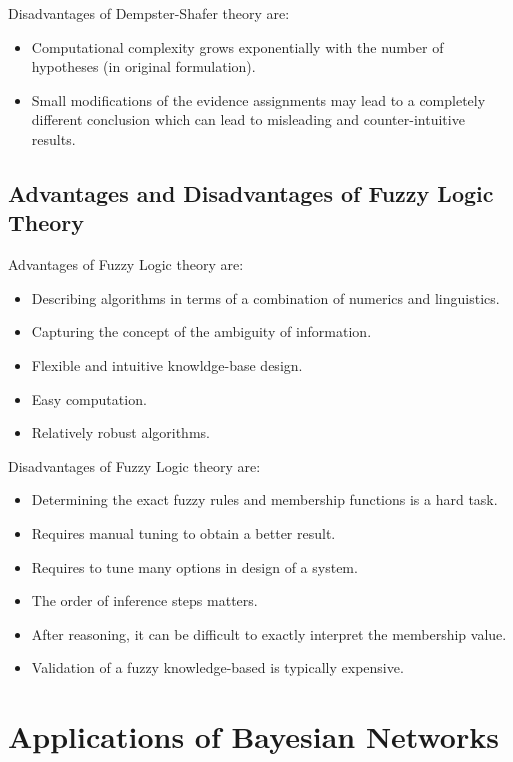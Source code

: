 \documentclass[11pt]{article}
\begin{document}
\noindent Disadvantages of Dempster-Shafer theory are:

\begin{itemize}
  \item Computational complexity grows exponentially with the number of
  hypotheses (in original formulation).
  
  \item Small modifications of the evidence assignments may lead to a
  completely different conclusion which can lead to misleading and
  counter-intuitive results.
\end{itemize}

\subsection{Advantages and Disadvantages of Fuzzy Logic Theory}

Advantages of Fuzzy Logic theory are:

\begin{itemize}
  \item Describing algorithms in terms of a combination of numerics and
  linguistics.
  \item Capturing the concept of the ambiguity of information.
  \item Flexible and intuitive knowldge-base design.
  \item Easy computation.
  \item Relatively robust algorithms.
\end{itemize}

\noindent Disadvantages of Fuzzy Logic theory are:

\begin{itemize}
  \item Determining the exact fuzzy rules and membership functions is a hard
  task.
  \item Requires manual tuning to obtain a better result.
  \item Requires to tune many options in design of a system.
  \item The order of inference steps matters.
  \item After reasoning, it can be difficult to exactly interpret the membership
  value.
  \item Validation of a fuzzy knowledge-based is typically expensive.
\end{itemize}

\section{Applications of Bayesian Networks}
\end{document}
